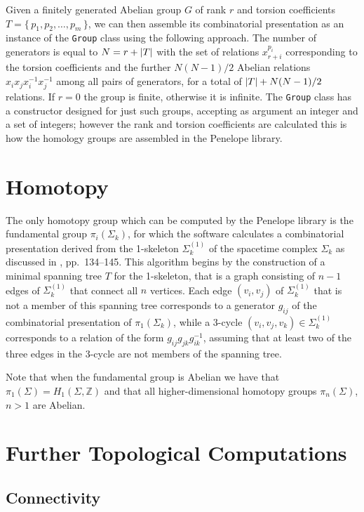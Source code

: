 \documentclass[12pt,letterpaper]{report}
\begin{document}
Given a finitely generated Abelian group $G$ of rank $r$ and torsion coefficients $T = \{\, p_1, p_2,\dots,
p_m \,\}$, we can then assemble its combinatorial presentation as an instance of the \texttt{Group} class using 
the following approach. The number of generators is equal to $N = r + \left\lvert T\right\rvert$ with the set of relations 
$x_{r+i}^{p_i}$ corresponding to the torsion coefficients and the further $N(N-1)/2$ Abelian relations $x_i 
x_j x_i^{-1} x_j^{-1}$ among all pairs of generators, for a total of $\left\lvert T\right\rvert + N(N-1)/2$ relations. If $r=0$ 
the group is finite, otherwise it is infinite. The \texttt{Group} class has a constructor designed for just such 
groups, accepting as argument an integer and a set of integers; however the rank and torsion coefficients 
are calculated this is how the homology groups are assembled in the Penelope library.       

\section{Homotopy} 

The only homotopy group which can be computed by the Penelope library is the fundamental group $\pi_i(\Sigma_k)$, 
for which the software calculates a combinatorial presentation derived from the 1-skeleton $\Sigma_k^{(1)}$ of 
the spacetime complex $\Sigma_k$ as discussed in \cite{Nakahara}, pp.\ 134--145. This algorithm begins by the 
construction of a minimal spanning tree $T$ for the 1-skeleton, that is a graph consisting of $n-1$ edges of 
$\Sigma_k^{(1)}$ that connect all $n$ vertices. Each edge $(v_i,v_j)$ of $\Sigma_k^{(1)}$ that is not a member 
of this spanning tree corresponds to a generator $g_{ij}$ of the combinatorial presentation of $\pi_1(\Sigma_k)$, 
while a 3-cycle $(v_i,v_j,v_k) \in \Sigma_k^{(1)}$ corresponds to a relation of the form $g_{ij} g_{jk} 
g_{ik}^{-1}$, assuming that at least two of the three edges in the 3-cycle are not members of the spanning tree. 

Note that when the fundamental group is Abelian we have that $\pi_1(\Sigma) = H_1(\Sigma,\mathbb{Z})$ and 
that all higher-dimensional homotopy groups $\pi_n(\Sigma)$, $n>1$ are Abelian.  

\section{Further Topological Computations}

\subsection{Connectivity}
\end{document}
